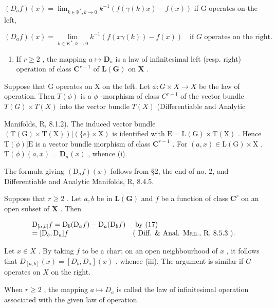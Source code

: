 \((D_{a}f)(x) = \lim_{k\in \mathbb{K}^{*},k\to 0}k^{-1}(f(\gamma (k)x) - f(x))\) if G operates on the left,

\[
(D _ {a} f) (x) = \lim _ {k \in K ^ {*}, k \rightarrow 0} k ^ {- 1} (f (x \gamma (k)) - f (x)) \quad \text {if } G \text { operates on the right}.
\]

\begin{enumerate}
\def\labelenumi{(\roman{enumi})}
\setcounter{enumi}{2}
\tightlist
\item
  If \(r \geqslant 2\) , the mapping \(a \mapsto \mathbf{D}_a\) is a law of infinitesimal left (resp. right) operation of class \(\mathbf{C}^{r-1}\) of \(\mathbf{L}(\mathbf{G})\) on \(\mathbf{X}\) .
\end{enumerate}

Suppose that G operates on X on the left. Let \(\phi: G \times X \to X\) be the law of operation. Then \(T(\phi)\) is a \(\phi\) -morphism of class \(C^{r-1}\) of the vector bundle \(T(G) \times T(X)\) into the vector bundle \(T(X)\) (Differentiable and Analytic

Manifolds, R, 8.1.2). The induced vector bundle \((\mathrm{T}(\mathrm{G}) \times \mathrm{T}(\mathrm{X}))|(\{e\} \times \mathrm{X})\) is identified with \(\mathrm{E} = \mathrm{L}(\mathrm{G}) \times \mathrm{T}(\mathrm{X})\) . Hence \(\mathrm{T}(\phi)|\mathrm{E}\) is a vector bundle morphism of class \(\mathbf{C}^{r-1}\) . For \((a, x) \in \mathrm{L}(\mathrm{G}) \times \mathrm{X}\) , \(\mathrm{T}(\phi)(a, x) = \mathbf{D}_{a}(x)\) , whence (i).

The formula giving \((\mathrm{D}_a f)(x)\) follows from §2, the end of no. 2, and Differentiable and Analytic Manifolds, R, 8.4.5.

Suppose that \(r \geqslant 2\) . Let \(a, b\) be in \(\mathbf{L}(\mathbf{G})\) and \(f\) be a function of class \(\mathbf{C}^r\) on an open subset of \(\mathbf{X}\) . Then

\[
\begin{array}{l l} \mathrm{D} _ {[ a, b ]} f = \mathrm{D} _ {b} (\mathrm{D} _ {a} f) - \mathrm{D} _ {a} (\mathrm{D} _ {b} f) & \text { by   (17) } \\ = [ \mathrm{D} _ {b}, \mathrm{D} _ {a} ] f & (\text { Diff.   \&   Anal.   Man.,   R,   8.5.3 }). \end{array}
\]

Let \(x \in X\) . By taking \(f\) to be a chart on an open neighbourhood of \(x\) , it follows that \(D_{[a,b]}(x) = [D_b, D_a](x)\) , whence (iii). The argument is similar if \(G\) operates on \(X\) on the right.

When \(r \geqslant 2\) , the mapping \(a \mapsto D_{a}\) is called the law of infinitesimal operation associated with the given law of operation.

